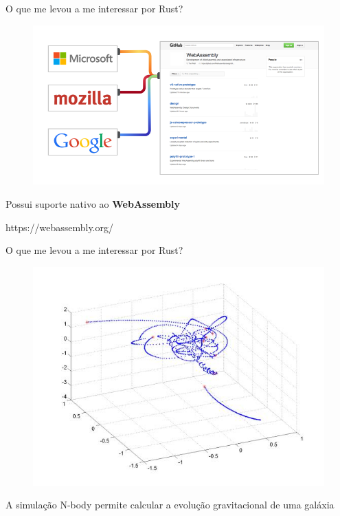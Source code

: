 \begin{frame}[fragile]{O que me levou a me interessar por Rust?}
\begin{figure}[ht!]
  \centering
  \includegraphics[scale=0.4]{images/webassembly.png}
\end{figure}
\begin{center}
\small{Possui suporte nativo ao \textbf{WebAssembly}}
\end{center}
\begin{center}
\small{https://webassembly.org/}
\end{center}
\end{frame}

\begin{frame}[fragile]{O que me levou a me interessar por Rust?}
\begin{figure}[ht!]
  \centering
  \includegraphics[scale=0.6]{images/n-body.jpg}
\end{figure}
\begin{center}
\small{A simulação N-body permite calcular a evolução gravitacional de uma galáxia}
\end{center}
\end{frame}

